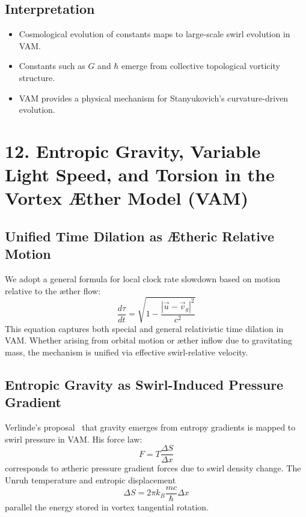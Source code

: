 \documentclass[11pt]{article}
\begin{document}
\subsection*{Interpretation}
\begin{itemize}
\item Cosmological evolution of constants maps to large-scale swirl evolution in VAM.
\item Constants such as $G$ and $\hbar$ emerge from collective topological vorticity structure.
\item VAM provides a physical mechanism for Stanyukovich’s curvature-driven evolution.
\end{itemize}


\section*{12. Entropic Gravity, Variable Light Speed, and Torsion in the Vortex \AE ther Model (VAM)}

\subsection{Unified Time Dilation as \AE theric Relative Motion}

We adopt a general formula for local clock rate slowdown based on motion relative to the æther flow:
\begin{equation}
    \frac{d\tau}{dt} = \sqrt{1 - \frac{|\vec{u} - \vec{v}_g|^2}{c^2}}
\end{equation}
This equation captures both special and general relativistic time dilation in VAM. Whether arising from orbital motion or æther inflow due to gravitating mass, the mechanism is unified via effective swirl-relative velocity.

\subsection{Entropic Gravity as Swirl-Induced Pressure Gradient}

Verlinde's proposal~\cite{verlinde2010emergent} that gravity emerges from entropy gradients is mapped to swirl pressure in VAM. His force law:
\begin{equation}
    F = T \frac{\Delta S}{\Delta x}
\end{equation}
corresponds to ætheric pressure gradient forces due to swirl density change. The Unruh temperature and entropic displacement
\begin{equation}
    \Delta S = 2\pi k_B \frac{mc}{\hbar} \Delta x
\end{equation}
parallel the energy stored in vortex tangential rotation.
\end{document}
